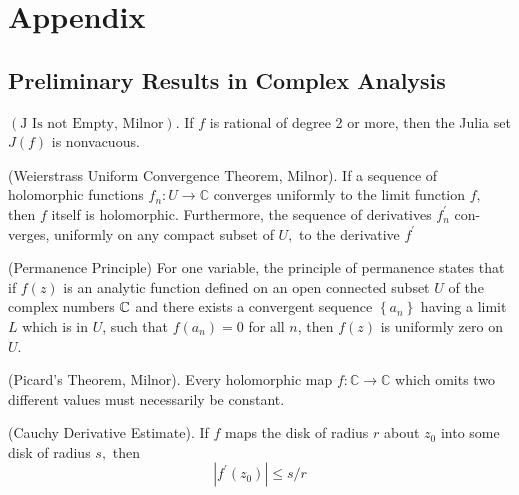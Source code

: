 \section{Appendix}

\subsection{Preliminary Results in Complex Analysis}


\begin{thm}
\label{app:thm:nonempty}
$(\mathrm{J} \text { Is not Empty, Milnor})$. If $f$ is rational of degree 2 or more, then the Julia set $J(f)$ is nonvacuous.
\end{thm}

\begin{thm}
\label{app:thm:weierstrass}
(Weierstrass Uniform Convergence Theorem, Milnor). If a sequence of holomorphic functions $f_{n}: U \rightarrow \mathbb{C}$ converges uniformly to the limit function $f,$ then $f$ itself is holomorphic. Furthermore, the sequence of derivatives $f_{n}^{\prime}$ con-
verges, uniformly on any compact subset of $U,$ to the derivative $f^{\prime}$
\end{thm}

\begin{thm}
\label{app:thm:permanence}
(Permanence Principle) For one variable, the principle of permanence states that if $f(z)$ is an analytic function defined on an open connected
subset $U$ of the complex numbers $\mathbb{C}$ and there exists a convergent sequence $\left\{a_{n}\right\}$ having a limit $L$ which is in $U$, such that $f\left(a_{n}\right)=0$ for all $n$, then $f(z)$ is uniformly zero on $U$.
\end{thm}

\begin{thm}
\label{app:thm:picard}
(Picard's Theorem, Milnor). Every holomorphic map $f: \mathbb{C} \rightarrow \mathbb{C}$ which omits two different values must necessarily be
constant.
\end{thm}


\begin{thm}
\label{app:thm:cauchyder}
(Cauchy Derivative Estimate). If $f$ maps the disk of radius $r$ about $z_{0}$ into some disk of radius $s,$ then
\[
\left|f^{\prime}\left(z_{0}\right)\right| \leq s / r
\]
\end{thm}

